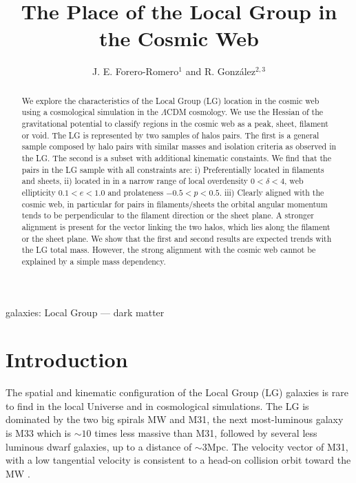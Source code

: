 \documentclass{emulateapj}
\newcommand{\mpc}{\rm{Mpc}}
\begin{document}
\title{The Place of the Local Group in the Cosmic Web}
\author{J. E. Forero-Romero$^1$ and R. Gonz\'alez$^{2,3}$}


\begin{abstract}
We explore the characteristics of the Local Group (LG)
location in the cosmic web using a cosmological simulation in the
$\Lambda$CDM cosmology.  We use the Hessian of the gravitational
potential to classify regions in the cosmic web as a peak, sheet,
filament or void.  The LG is represented by two samples of halos
pairs. The first is a general sample composed by halo pairs with
similar masses and isolation criteria as observed in the LG.  The
second is a subset with additional kinematic constaints. We find that
the pairs in the LG sample with all constraints are: i) Preferentially
located in filaments and sheets, ii) located in in a narrow range of
local overdensity $0<\delta<4$, web ellipticity $0.1<e<1.0$ and
prolateness $-0.5<p<0.5$.  iii) Clearly aligned with the cosmic web,
in particular for pairs in filaments/sheets the orbital angular
momentum tends to be perpendicular to the filament direction or the
sheet plane. A stronger alignment is present for the vector linking
the two halos, which lies along the filament or the sheet plane.  We
show that the first and second results are expected trends with the LG
total mass. However, the strong alignment with the cosmic web cannot
be explained by a simple mass dependency.

\end{abstract}

\begin{keywords}
{galaxies: Local Group --- dark matter}
\end{keywords}


\section{Introduction}
\label{sec:intro}

The spatial and kinematic configuration of the Local Group
(LG) galaxies is rare to find in the local Universe and in cosmological
simulations. 
The LG is dominated by the two big spirals MW and M31, the next
most-luminous galaxy is M33 which is $\sim 10$ times less massive than
M31, followed by several less luminous dwarf galaxies, up to a
distance of $\sim 3$\mpc.   
The velocity vector of M31, with a low
tangential velocity is consistent to a head-on collision orbit toward
the MW
\citep{2008MNRAS.386..461C,2012ApJ...753....8V,2012ApJ...753....7S}.   
\end{document}
